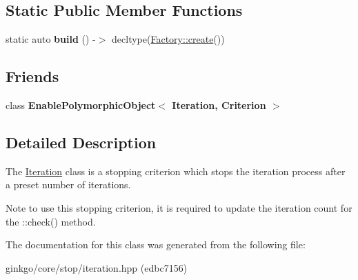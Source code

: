 \subsection*{Static Public Member Functions}
\begin{DoxyCompactItemize}
\item 
\mbox{\label{classgko_1_1stop_1_1Iteration_ae1644e1beb79d560ec9f1e63d147e258}} 
static auto {\bfseries build} () -\/$>$ decltype(\hyperlink{classgko_1_1EnableDefaultFactory_a1d077101d9e788e6c65f088612d14cc3}{Factory\+::create}())
\end{DoxyCompactItemize}
\subsection*{Friends}
\begin{DoxyCompactItemize}
\item 
\mbox{\label{classgko_1_1stop_1_1Iteration_a53441469892d9e127b487d868cd90aee}} 
class {\bfseries Enable\+Polymorphic\+Object$<$ Iteration, Criterion $>$}
\end{DoxyCompactItemize}


\subsection{Detailed Description}
The \hyperlink{classgko_1_1stop_1_1Iteration}{Iteration} class is a stopping criterion which stops the iteration process after a preset number of iterations. 

\begin{DoxyNote}{Note}
to use this stopping criterion, it is required to update the iteration count for the \+::check() method. 
\end{DoxyNote}


The documentation for this class was generated from the following file\+:\begin{DoxyCompactItemize}
\item 
ginkgo/core/stop/iteration.\+hpp (edbc7156)\end{DoxyCompactItemize}
